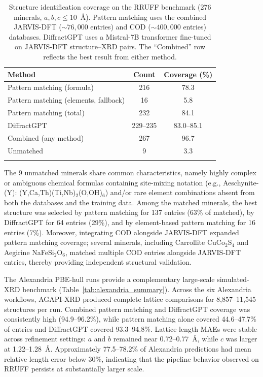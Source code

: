 \documentclass[pdflatex,sn-mathphys-num]{sn-jnl}
\theoremstyle{thmstyleone}
\theoremstyle{thmstyletwo}
\theoremstyle{thmstylethree}
\begin{document}
\begin{table}[h]
\caption{Structure identification coverage on the RRUFF benchmark (276 minerals, $a,b,c \leq 10$~\AA). Pattern matching uses the combined JARVIS-DFT (${\sim}76{,}000$ entries) and COD (${\sim}400{,}000$ entries) databases. DiffractGPT uses a Mistral-7B transformer fine-tuned on JARVIS-DFT structure--XRD pairs. The ``Combined'' row reflects the best result from either method.}\label{tab:coverage}
\begin{tabular}{@{}lcc@{}}
\toprule
Method & Count & Coverage (\%) \\
\midrule
Pattern matching (formula) & 216 & 78.3 \\
Pattern matching (elements, fallback) & 16 & 5.8 \\
Pattern matching (total) & 232 & 84.1 \\
DiffractGPT & 229--235 & 83.0--85.1 \\
Combined (any method) & 267 & 96.7 \\
Unmatched & 9 & 3.3 \\
\botrule
\end{tabular}
\end{table}

The 9 unmatched minerals share common characteristics, namely highly complex or ambiguous chemical formulas containing site-mixing notation (e.g., Aeschynite-(Y): (Y,Ca,Th)(Ti,Nb)$_2$(O,OH)$_6$) and/or rare element combinations absent from both the databases and the training data. Among the matched minerals, the best structure was selected by pattern matching for 137 entries (63\% of matched), by DiffractGPT for 64 entries (29\%), and by element-based pattern matching for 16 entries (7\%). Moreover, integrating COD alongside JARVIS-DFT expanded pattern matching coverage; several minerals, including Carrollite CuCo$_2$S$_4$ and Aegirine NaFeSi$_2$O$_6$, matched multiple COD entries alongside JARVIS-DFT entries, thereby providing independent structural validation.

The Alexandria PBE-hull runs provide a complementary large-scale simulated-XRD benchmark (Table~\ref{tab:alexandria_summary}). Across the six Alexandria workflows, AGAPI-XRD produced complete lattice comparisons for 8{,}857--11{,}545 structures per run. Combined pattern matching and DiffractGPT coverage was consistently high (94.9--96.2\%), while pattern matching alone covered 44.6--47.7\% of entries and DiffractGPT covered 93.3--94.8\%. Lattice-length MAEs were stable across refinement settings: $a$ and $b$ remained near 0.72--0.77~\AA{}, while $c$ was larger at 1.22--1.28~\AA{}. Approximately 77.5--78.2\% of Alexandria predictions had mean relative length error below 30\%, indicating that the pipeline behavior observed on RRUFF persists at substantially larger scale.
\end{document}
